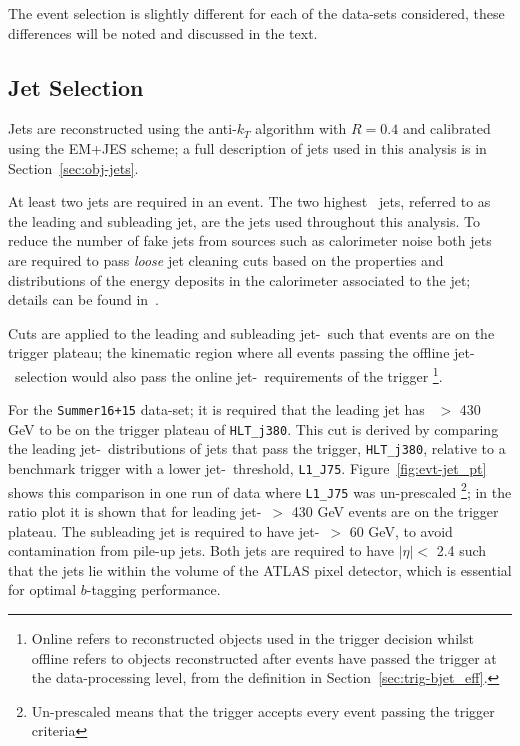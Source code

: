 The event selection is slightly different for each of the data-sets considered,
these differences will be noted and discussed in the text.

\subsection{Jet Selection}
\label{sec:evt-sel-jets}

Jets are reconstructed using the anti-$k_T$ algorithm with $R=0.4$
and calibrated using the EM+JES scheme;
a full description of jets used in this analysis is in Section~\ref{sec:obj-jets}.

At least two jets are required in an event.
The two highest \pT~jets, referred to as the leading and subleading jet,
are the jets used throughout this analysis.
To reduce the number of fake jets from sources such as calorimeter noise
both jets are required to pass \textit{loose} jet cleaning cuts
based on the properties and distributions of the energy deposits in the calorimeter associated to the jet;
details can be found in~\cite{evt-jet_cleaning}.

Cuts are applied to the leading and subleading jet-\pT~such that events are on the trigger plateau;
the kinematic region where all events passing the offline jet-\pT~selection
would also pass the online jet-\pT~requirements of the trigger
\footnote{Online refers to reconstructed objects used in the trigger decision
  whilst offline refers to objects reconstructed after events have passed the trigger at the data-processing level,
  from the definition in Section~\ref{sec:trig-bjet_eff}.}.

For the \verb|Summer16+15| data-set; it is required that the leading jet has \pT~$>$ 430 GeV to be on the trigger plateau of \verb|HLT_j380|.
This cut is derived by comparing the leading jet-\pT~distributions of jets that pass the trigger, \verb|HLT_j380|,
relative to a benchmark trigger with a lower jet-\pT~threshold, \verb|L1_J75|.
Figure~\ref{fig:evt-jet_pt} shows this comparison in one run of data where \verb|L1_J75| was un-prescaled
\footnote{Un-prescaled means that the trigger accepts every event passing the trigger criteria};
in the ratio plot it is shown that for leading jet-\pT~$>$ 430 GeV events are on the trigger plateau.
The subleading jet is required to have jet-\pT~$>$ 60 GeV,
to avoid contamination from pile-up jets.
Both jets  are required to have $|\eta| <$ 2.4
such that the jets lie within the volume of the ATLAS pixel detector,
which is essential for optimal $b$-tagging performance.


